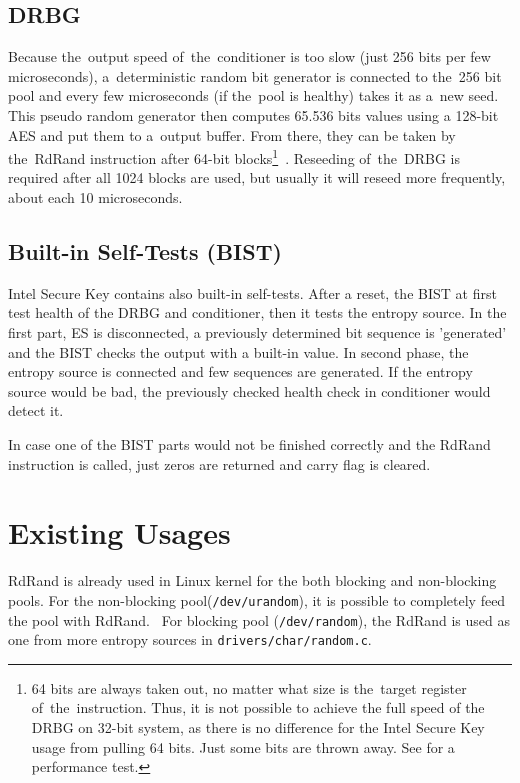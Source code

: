 \subsection{DRBG}\label{subsec:DRBG}
\par{
Because the~output speed of~the~conditioner is too slow (just 256 bits per few 
microseconds), 
a~deterministic random bit generator is connected to the~256 bit pool 
and every few microseconds (if the~pool is healthy) takes it as a~new seed. 
This pseudo random generator then computes 65.536 bits values using 
a 128-bit AES and put them to a~output buffer. 
From there, they can be taken by the~RdRand instruction after 64-bit 
blocks\footnote{64 bits are always taken out, no matter what size is 
the~target register of~the~instruction. Thus, it is not possible to achieve the full 
speed of the DRBG on 32-bit system, as there is no difference for the Intel 
Secure Key usage from pulling 64 bits. Just some bits are thrown away. 
See  for a performance test.}~\cite{AnalysisOfDRNG,UnderstandingRdRandElectronic}. 
Reseeding of~the~DRBG is required after all 1024 blocks are used, 
but usually it will reseed more frequently, 
about each 10 microseconds.~\cite[Chapter~4.4]{IntelDRNGGuide}
}
\subsection{Built-in Self-Tests (BIST)}
\par{
Intel Secure Key contains also built-in self-tests. After a reset, the BIST at first test 
health of the DRBG and conditioner, then it tests the entropy source. In the first 
part, ES is disconnected, a previously determined bit sequence is 'generated' 
and the BIST checks the output with a built-in value. In second phase, 
the entropy source is connected and few sequences are generated. 
If the entropy source would be bad, the previously checked health check in conditioner would detect it. 
}

\par{
In case one of the BIST parts would not be finished correctly and the RdRand 
instruction is called, just zeros are returned and carry flag is cleared.~\cite{AnalysisOfDRNG}
}

\section{Existing Usages} 
\par{
RdRand is already used in Linux kernel for the both blocking and non-blocking pools. For the non-blocking pool({\tt /dev/urandom}), it is possible to completely feed the pool with RdRand.~\cite{KernelRdRand} For blocking pool ({\tt /dev/random}), the RdRand is used as one from more entropy sources in {\tt drivers/char/random.c}.
}

